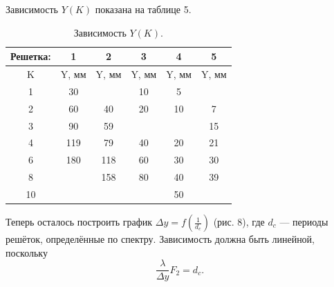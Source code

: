 \documentclass[a4paper, 14pt]{extarticle}%
\newcommand\ECaption[1]{%
     \captionsetup{font=footnotesize}%
     \caption{#1}}
\begin{document}
Зависимость $Y(K)$ показана на таблице 5.
\begin{table}[h!]
\begin{center}
\begin{tabular}{|c|c|c|c|c|c|}
\hline
\rowcolor[HTML]{00D2CB} 
Решетка: & 1                        & 2                        & 3                        & 4                        & 5                        \\ \hline
\rowcolor[HTML]{9698ED} 
K        & Y, мм                    & Y, мм                    & Y, мм                    & Y, мм                    & Y, мм                    \\ \hline
1        & 30                       & \cellcolor[HTML]{DAE8FC} & 10                       & 5                        & \cellcolor[HTML]{DAE8FC} \\ \hline
\rowcolor[HTML]{9698ED} 
2        & 60                       & 40                       & 20                       & 10                       & 7                        \\ \hline
3        & 90                       & 59                       & \cellcolor[HTML]{DAE8FC} & \cellcolor[HTML]{DAE8FC} & 15                       \\ \hline
\rowcolor[HTML]{9698ED} 
4        & 119                      & 79                       & 40                       & 20                       & 21                       \\ \hline
6        & 180                      & 118                      & 60                       & 30                       & 30                       \\ \hline
\rowcolor[HTML]{9698ED} 
8        & \cellcolor[HTML]{DAE8FC} & 158                      & 80                       & 40                       & 39                       \\ \hline
10       & \cellcolor[HTML]{DAE8FC} & \cellcolor[HTML]{DAE8FC} & \cellcolor[HTML]{DAE8FC} & 50                       & \cellcolor[HTML]{DAE8FC} \\ \hline
\end{tabular}
\ECaption{Зависимость $Y(K)$.}
\end{center}
\end{table}

Теперь осталось построить график
$ \Delta y = f(\frac{1}{d_c}) $ (рис. 8), где
$ d_c $ — периоды решёток, определённые по спектру. Зависимость должна быть линейной, поскольку
\[\frac{\lambda}{\Delta y} F_2 = d_c.\]
\end{document}
